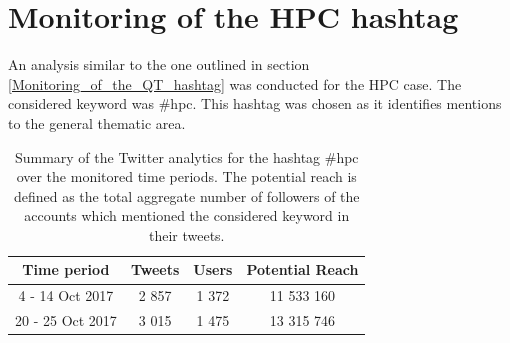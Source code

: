 \section{Monitoring of the HPC hashtag} \label{Monitoring_of_the_HPC_hashtag}
An analysis similar to the one outlined in section \ref{Monitoring_of_the_QT_hashtag} was conducted for the HPC case. The considered keyword was \#hpc. This hashtag was chosen as it identifies mentions to the general thematic area.

\begin{table}[t]
 \begin{center}
  \begin{tabular}{cccc}
   \hline 
   \hline
   Time period & Tweets & Users & Potential Reach \\ 
   \hline
   \hline
   4 - 14 Oct 2017 & 2 857 & 1 372 & 11 533 160  \\
   20 - 25 Oct 2017 & 3 015 & 1 475 & 13 315 746  \\
   \hline
   \hline
  \end{tabular}
 \end{center} 
 \caption{Summary of the Twitter analytics for the hashtag \#hpc over the monitored time periods. The potential reach is defined as the total aggregate number of followers of the accounts which mentioned the considered keyword in their tweets.}
\label{Summary_HPC} 
\end{table}

